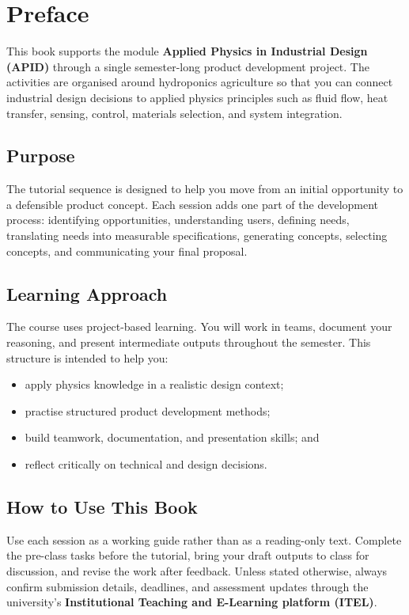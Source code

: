 \chapter*{Preface}

This book supports the module \textbf{Applied Physics in Industrial Design (APID)} through a single semester-long product development project. The activities are organised around hydroponics agriculture so that you can connect industrial design decisions to applied physics principles such as fluid flow, heat transfer, sensing, control, materials selection, and system integration.

\section*{Purpose}

The tutorial sequence is designed to help you move from an initial opportunity to a defensible product concept. Each session adds one part of the development process: identifying opportunities, understanding users, defining needs, translating needs into measurable specifications, generating concepts, selecting concepts, and communicating your final proposal.

\section*{Learning Approach}

The course uses project-based learning. You will work in teams, document your reasoning, and present intermediate outputs throughout the semester. This structure is intended to help you:
\begin{itemize}
    \item apply physics knowledge in a realistic design context;
    \item practise structured product development methods;
    \item build teamwork, documentation, and presentation skills; and
    \item reflect critically on technical and design decisions.
\end{itemize}

\section*{How to Use This Book}

Use each session as a working guide rather than as a reading-only text. Complete the pre-class tasks before the tutorial, bring your draft outputs to class for discussion, and revise the work after feedback. Unless stated otherwise, always confirm submission details, deadlines, and assessment updates through the university's \textbf{Institutional Teaching and E-Learning platform (ITEL)}.

